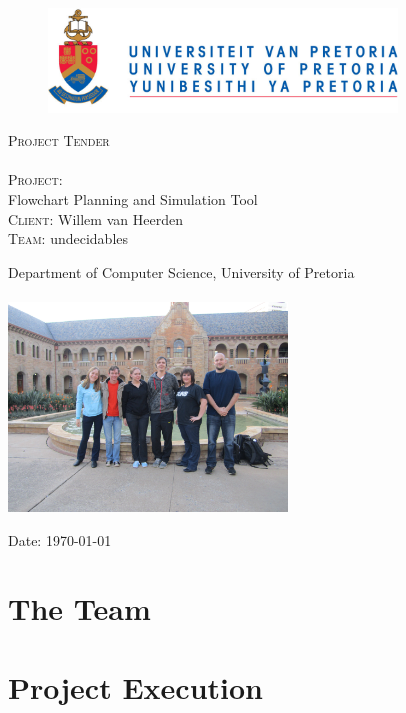 \documentclass[12pt]{article}
\begin{document}
\begin{titlepage}
	\begin{center}
		
		\begin{figure}[t]
			\centering
			\includegraphics[width=350px]{UP_Logo.png}
		\end{figure}
		
		\textsc{\Huge Project Tender} \\ 

		\textsc{\huge \\Project:\\	}
		\huge Flowchart Planning and Simulation Tool
		\textsc{\Large \\Client:}
		\large Willem van Heerden\\
		\textsc{\huge Team:}
		\huge \textsc{}undecidables\textsc{}
		
		\small Department of Computer Science, University of Pretoria \\
		\hfill \\
		\includegraphics[width=280px]{Team.JPG}\\

	\vfill

	{\large Date: \today}		
		
		
	\end{center}
\end{titlepage}

\pagebreak
\tableofcontents

\pagebreak

\section{The Team}

\pagebreak
\section{Project Execution}

\end{document}
